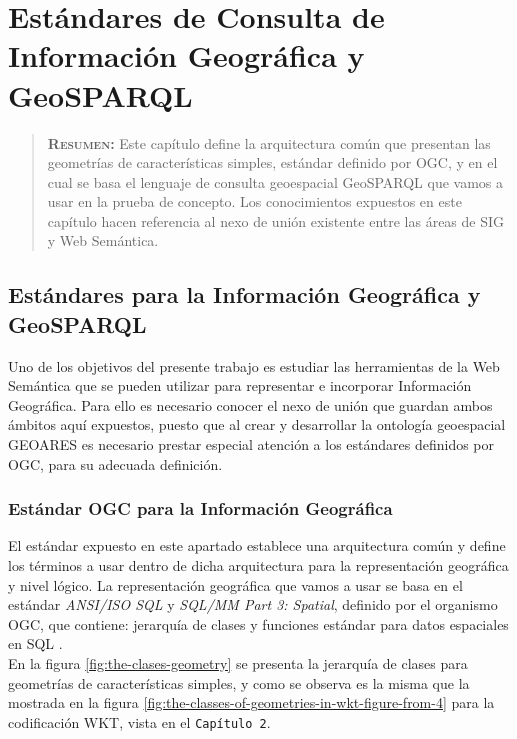 
\chapter{Estándares de Consulta de Información Geográfica y GeoSPARQL}
\label{ch:ge}

\begin{quote}
  {\bf\textsc{Resumen:}} Este capítulo define la arquitectura común que presentan las geometrías de características simples, estándar definido por OGC, y en el cual se basa el lenguaje de consulta geoespacial GeoSPARQL que vamos a usar en la prueba de concepto. Los conocimientos expuestos en este capítulo hacen referencia al nexo de unión existente entre las áreas de SIG y Web Semántica.
\end{quote}

\section{Estándares para la Información Geográfica y GeoSPARQL}

Uno de los objetivos del presente trabajo es estudiar las herramientas de la Web Semántica que se pueden utilizar para representar e incorporar Información Geográfica. Para ello es necesario conocer el nexo de unión que guardan ambos ámbitos aquí expuestos, puesto que al crear y desarrollar la ontología geoespacial GEOARES es necesario prestar especial atención a los estándares definidos por OGC, para su adecuada definición.


\subsection{Estándar OGC para la Información Geográfica}

El estándar expuesto en este apartado establece una arquitectura común y define los términos a usar dentro de dicha arquitectura para la representación geográfica y nivel lógico. La representación geográfica que vamos a usar se basa en el estándar \textit{ANSI/ISO SQL} y \textit{SQL/MM Part 3: Spatial}, definido por el organismo OGC, que contiene: jerarquía de clases y funciones estándar para datos espaciales en SQL \cite{AsignaturaSIG}.\\

En la figura \ref{fig:the-clases-geometry} se presenta la jerarquía de clases para geometrías de características simples, y como se observa es la misma que la mostrada en la figura \ref{fig:the-classes-of-geometries-in-wkt-figure-from-4} para la codificación WKT, vista en el \texttt{Capítulo 2}.

